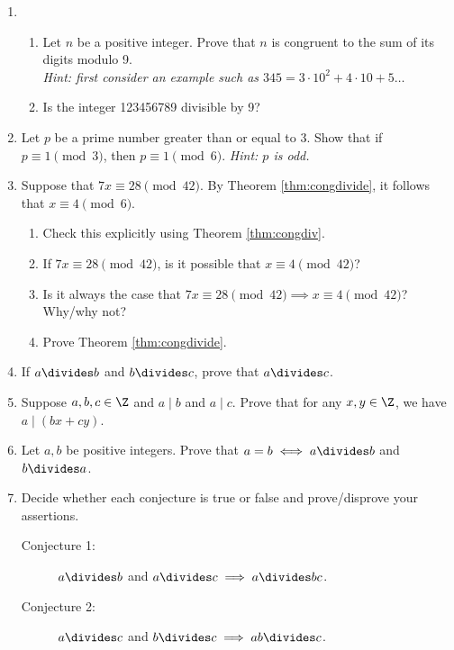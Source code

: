 \begin{enumerate}
  \item\begin{enumerate}
    \item Let $n$ be a positive integer. Prove that $n$ is congruent to the sum of its digits modulo 9.\\
    \emph{Hint: first consider an example such as $345=3\cdot 10^2+4\cdot 10+5\ldots$}
    \item Is the integer 123456789 divisible by 9?
  \end{enumerate}
  
  \item Let $p$ be a prime number greater than or equal to 3. Show that if $p\equiv 1\pmod 3$, then $p\equiv 1\pmod 6$. \emph{Hint: $p$ is odd.} 
  
  \item\label{ex:thmcongdivide} Suppose that $7x\equiv 28\pmod{42}$. By Theorem \ref{thm:congdivide}, it follows that $x\equiv 4\pmod{6}$.
  \begin{enumerate}
    \item Check this explicitly using Theorem \ref{thm:congdiv}.
    \item If $7x\equiv 28\pmod{42}$, is it possible that $x\equiv 4\pmod{42}$?
    \item Is it always the case that $7x\equiv 28\pmod{42}\implies x\equiv 4\pmod{42}$? Why/why not?
    \item Prove Theorem \ref{thm:congdivide}.
  \end{enumerate}
  
  \item If $a\divides b$ and $b\divides c$, prove that $a\divides c$.
  
  \item Suppose $a,b,c \in \Z$ and $a \mid b$ and $a \mid c$. Prove that for any $x,y \in \Z$, we have $a \mid (bx + cy)$.
  
  \item\label{ex:adivb} Let $a,b$ be positive integers. Prove that $a=b\iff a\divides b$ and $b\divides a$.
  
  \item Decide whether each conjecture is true or false and prove/disprove your assertions.
  \begin{description}
    \item[Conjecture 1:] $a\divides b$ and $a\divides c\implies a\divides bc$.
    \item[Conjecture 2:] $a\divides c$ and $b\divides c\implies ab\divides c$.
  \end{description}


\end{enumerate}
